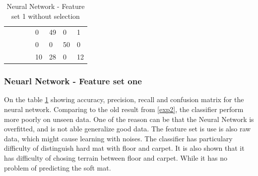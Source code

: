 \documentclass[USenglish]{ifimaster}  %
\begin{document}
\begin{table}[h]
{\begin{tabular}{@{}llllllll@{}}
\multicolumn{1}{l|}{} & \multicolumn{1}{l|}{} & \multicolumn{1}{l|}{} & \multicolumn{1}{l|}{} & \multicolumn{1}{l|}{0} & \multicolumn{1}{l|}{49} & \multicolumn{1}{l|}{0} & 1 \\ \cmidrule(l){5-8} 
\multicolumn{1}{l|}{} & \multicolumn{1}{l|}{} & \multicolumn{1}{l|}{} & \multicolumn{1}{l|}{} & \multicolumn{1}{l|}{0} & \multicolumn{1}{l|}{0} & \multicolumn{1}{l|}{50} & 0 \\ \cmidrule(l){5-8} 
\multicolumn{1}{l|}{} & \multicolumn{1}{l|}{} & \multicolumn{1}{l|}{} & \multicolumn{1}{l|}{} & \multicolumn{1}{l|}{10} & \multicolumn{1}{l|}{28} & \multicolumn{1}{l|}{0} & 12 \\ \bottomrule
\end{tabular}%
}
\caption{Neural Network - Feature set 1 without selection}
\label{nn2}
\end{table}
\FloatBarrier

\subsubsection{Neuarl Network - Feature set one}
On the table \ref{nn2} showing accuracy, precision, recall and confusion matrix for the neural network. Comparing to the old result from \ref{exp2}, the classifier perform more poorly on unseen data. One of the reason can be that the Neural Network is overfitted, and is not able generalize good data. The feature set is use is also raw data, which might cause learning with noises. The classifier has particulary difficulty of distinguish hard mat with floor and carpet. It is also shown that it has difficulty of chosing terrain between floor and carpet. While it has no problem of predicting the soft mat. 
\end{document}
